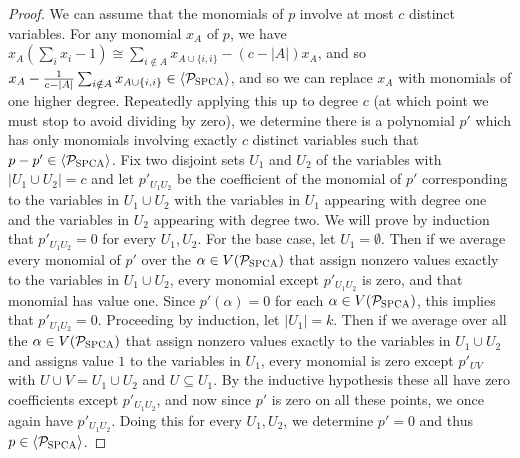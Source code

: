 \begin{proof}
We can assume that the monomials of $p$ involve at most $c$ distinct variables. For any monomial $x_A$ of $p$, we have $x_A(\sum_i x_i - 1) \cong \sum_{i \notin A} x_{A \cup \{i,i\}} - (c-|A|)x_A$, and so $x_A - \frac{1}{c - |A|}\sum_{i \notin A} x_{A \cup \{i,i\}} \in \langle \mathcal P_{\textsc{SPCA}} \rangle$, and so we can replace $x_A$ with monomials of one higher degree. Repeatedly applying this up to degree $c$ (at which point we must stop to avoid dividing by zero), we determine there is a polynomial $p'$ which has only monomials involving exactly $c$ distinct variables such that $p - p' \in \langle \mathcal P_{\textsc{SPCA}} \rangle$. Fix two disjoint sets $U_1$ and $U_2$ of the variables with $|U_1 \cup U_2| = c$ and let $p'_{U_1U_2}$ be the coefficient of the monomial of $p'$ corresponding to the variables in $U_1 \cup U_2$ with the variables in $U_1$ appearing with degree one and the variables in $U_2$ appearing with degree two. We will prove by induction that $p'_{U_1U_2} = 0$ for every $U_1,U_2$. For the base case, let $U_1 = \emptyset$. Then if we average every monomial of $p'$ over the $\alpha \in V(\mathcal P_{\textsc{SPCA}})$ that assign nonzero values exactly to the variables in $U_1 \cup U_2$, every monomial except $p'_{U_1U_2}$ is zero, and that monomial has value one. Since $p'(\alpha) = 0$ for each $\alpha \in V(\mathcal P_{\textsc{SPCA}})$, this implies that $p'_{U_1U_2} = 0$. Proceeding by induction, let $|U_1| = k$. Then if we average over all the $\alpha \in V(\mathcal P_{\textsc{SPCA}})$ that assign nonzero values exactly to the variables in $U_1 \cup U_2$ and assigns value $1$ to the variables in $U_1$, every monomial is zero except $p'_{UV}$ with $U \cup V = U_1 \cup U_2$ and $U \subseteq U_1$. By the inductive hypothesis these all have zero coefficients except $p'_{U_1U_2}$, and now since $p'$ is zero on all these points, we once again have $p'_{U_1U_2}$. Doing this for every $U_1,U_2$, we determine $p' = 0$ and thus $p \in \langle \mathcal P_{\textsc{SPCA}} \rangle$. 
\end{proof}

